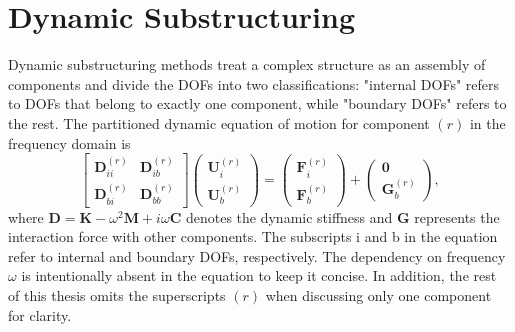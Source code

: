 %
%

\section{Dynamic Substructuring}
\label{sec: substructuring}

Dynamic substructuring methods treat a complex structure as an assembly of components and divide the DOFs into two classifications: "internal DOFs" refers to DOFs that belong to exactly one component, while "boundary DOFs" refers to the rest.
{The partitioned dynamic equation of motion for component $(r)$ in the frequency domain is}%
\begin{equation}
    \begin{bmatrix}
        \mathbf{D}_{ii}^{(r)} & \mathbf{D}_{ib}^{(r)} \\
        \mathbf{D}_{bi}^{(r)} & \mathbf{D}_{bb}^{(r)}
    \end{bmatrix}
    \begin{pmatrix}
        \mathbf{U}_{i}^{(r)} \\
        \mathbf{U}_{b}^{(r)}
    \end{pmatrix}
    =
    \begin{pmatrix}
        \mathbf{F}_{i}^{(r)} \\
        \mathbf{F}_{b}^{(r)}
    \end{pmatrix}
    +
    \begin{pmatrix}
        \mathbf{0} \\
        \mathbf{G}_{b}^{(r)}
    \end{pmatrix},
    \label{initial_eq_of_motion}
\end{equation}
where $\mathbf{D}=\mathbf{K}-\omega^{2}\mathbf{M}+i\omega\mathbf{C}$ denotes the dynamic stiffness and $\mathbf{G}$ represents the interaction force with other components.
The subscripts i and b in the equation refer to internal and boundary DOFs, respectively.
The dependency on frequency $\omega$ is intentionally absent in the equation to keep it concise.
In addition, the rest of this thesis omits the superscripts $(r)$ when discussing only one component for clarity.



